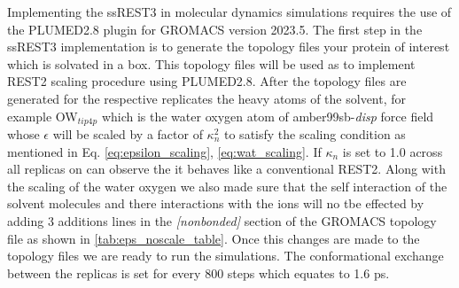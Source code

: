 Implementing the ssREST3 in molecular dynamics simulations requires the use of the PLUMED2.8 plugin for GROMACS version 2023.5. 
The first step in the ssREST3 implementation is to generate the topology files your protein of interest which is solvated in a box. 
This topology files will be used as to implement REST2 scaling procedure using PLUMED2.8. 
After the topology files are generated for the respective replicates the heavy atoms 
of the solvent, for example OW$_{tip4p}$ which is the water oxygen atom of amber99sb-\textit{disp} force field whose $\epsilon$ will be scaled by a factor of $\kappa^{2}_{n}$ to satisfy the scaling condition 
as mentioned in Eq. \ref{eq:epsilon_scaling}, \ref{eq:wat_scaling}. 
If $\kappa_{n}$ is set to 1.0 across all replicas on can observe the it behaves like a conventional REST2. 
Along with the scaling of the water oxygen we also made sure that the self interaction of the solvent molecules and there interactions with the ions will no tbe effected by adding 3 additions lines in the \textit{[nonbonded]} section of the GROMACS topology file as shown in \ref{tab:eps_noscale_table}.
Once this changes are made to the topology files we are ready to run the simulations.
The conformational exchange between the replicas is set for every 800 steps which equates to 1.6 ps.    